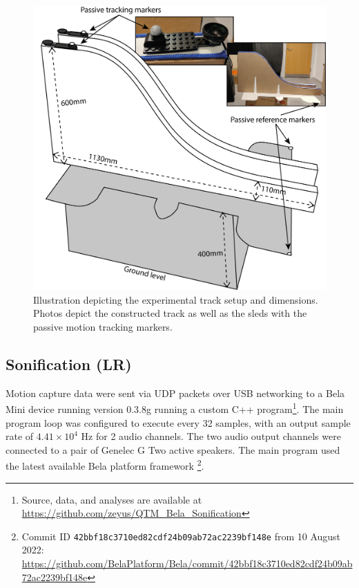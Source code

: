 \documentclass[10pt,a4paper,onecolumn]{article}
\begin{document}
\begin{figure}[h]

{\centering \includegraphics[width=1\linewidth]{figures/track_dimensions} 

}

\caption{Illustration depicting the experimental track setup and dimensions. Photos depict the constructed track as well as the sleds with the passive motion tracking markers.}\label{fig:track-setup}
\end{figure}

\hypertarget{sonification-lr}{%
\subsection{Sonification (LR)}\label{sonification-lr}}

Motion capture data were sent via UDP packets over USB networking to a Bela Mini device running version 0.3.8g running a custom C++ program\footnote{Source, data, and analyses are available at \url{https://github.com/zeyus/QTM_Bela_Sonification}}. The main program loop was configured to execute every 32 samples, with an output sample rate of \ensuremath{4.41\times 10^{4}} Hz for 2 audio channels. The two audio output channels were connected to a pair of Genelec G Two active speakers. The main program used the latest available Bela platform framework \footnote{Commit ID \texttt{42bbf18c3710ed82cdf24b09ab72ac2239bf148e} from 10 August 2022: \url{https://github.com/BelaPlatform/Bela/commit/42bbf18c3710ed82cdf24b09ab72ac2239bf148e}}.
\end{document}
